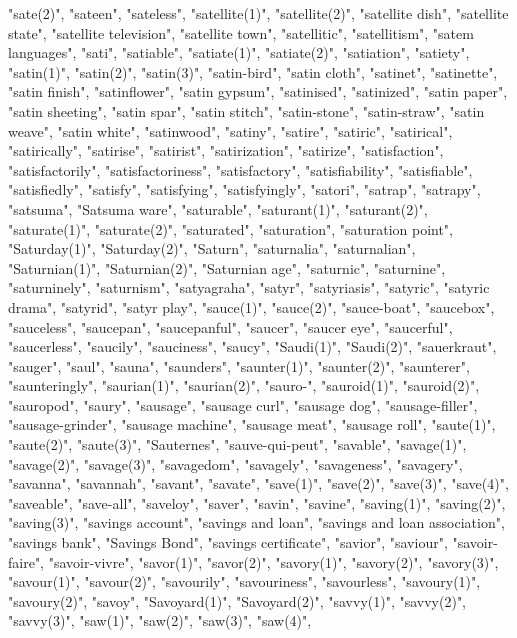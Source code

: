"sate(2)",
"sateen",
"sateless",
"satellite(1)",
"satellite(2)",
"satellite dish",
"satellite state",
"satellite television",
"satellite town",
"satellitic",
"satellitism",
"satem languages",
"sati",
"satiable",
"satiate(1)",
"satiate(2)",
"satiation",
"satiety",
"satin(1)",
"satin(2)",
"satin(3)",
"satin-bird",
"satin cloth",
"satinet",
"satinette",
"satin finish",
"satinflower",
"satin gypsum",
"satinised",
"satinized",
"satin paper",
"satin sheeting",
"satin spar",
"satin stitch",
"satin-stone",
"satin-straw",
"satin weave",
"satin white",
"satinwood",
"satiny",
"satire",
"satiric",
"satirical",
"satirically",
"satirise",
"satirist",
"satirization",
"satirize",
"satisfaction",
"satisfactorily",
"satisfactoriness",
"satisfactory",
"satisfiability",
"satisfiable",
"satisfiedly",
"satisfy",
"satisfying",
"satisfyingly",
"satori",
"satrap",
"satrapy",
"satsuma",
"Satsuma ware",
"saturable",
"saturant(1)",
"saturant(2)",
"saturate(1)",
"saturate(2)",
"saturated",
"saturation",
"saturation point",
"Saturday(1)",
"Saturday(2)",
"Saturn",
"saturnalia",
"saturnalian",
"Saturnian(1)",
"Saturnian(2)",
"Saturnian age",
"saturnic",
"saturnine",
"saturninely",
"saturnism",
"satyagraha",
"satyr",
"satyriasis",
"satyric",
"satyric drama",
"satyrid",
"satyr play",
"sauce(1)",
"sauce(2)",
"sauce-boat",
"saucebox",
"sauceless",
"saucepan",
"saucepanful",
"saucer",
"saucer eye",
"saucerful",
"saucerless",
"saucily",
"sauciness",
"saucy",
"Saudi(1)",
"Saudi(2)",
"sauerkraut",
"sauger",
"saul",
"sauna",
"saunders",
"saunter(1)",
"saunter(2)",
"saunterer",
"saunteringly",
"saurian(1)",
"saurian(2)",
"sauro-",
"sauroid(1)",
"sauroid(2)",
"sauropod",
"saury",
"sausage",
"sausage curl",
"sausage dog",
"sausage-filler",
"sausage-grinder",
"sausage machine",
"sausage meat",
"sausage roll",
"saute(1)",
"saute(2)",
"saute(3)",
"Sauternes",
"sauve-qui-peut",
"savable",
"savage(1)",
"savage(2)",
"savage(3)",
"savagedom",
"savagely",
"savageness",
"savagery",
"savanna",
"savannah",
"savant",
"savate",
"save(1)",
"save(2)",
"save(3)",
"save(4)",
"saveable",
"save-all",
"saveloy",
"saver",
"savin",
"savine",
"saving(1)",
"saving(2)",
"saving(3)",
"savings account",
"savings and loan",
"savings and loan association",
"savings bank",
"Savings Bond",
"savings certificate",
"savior",
"saviour",
"savoir-faire",
"savoir-vivre",
"savor(1)",
"savor(2)",
"savory(1)",
"savory(2)",
"savory(3)",
"savour(1)",
"savour(2)",
"savourily",
"savouriness",
"savourless",
"savoury(1)",
"savoury(2)",
"savoy",
"Savoyard(1)",
"Savoyard(2)",
"savvy(1)",
"savvy(2)",
"savvy(3)",
"saw(1)",
"saw(2)",
"saw(3)",
"saw(4)",
